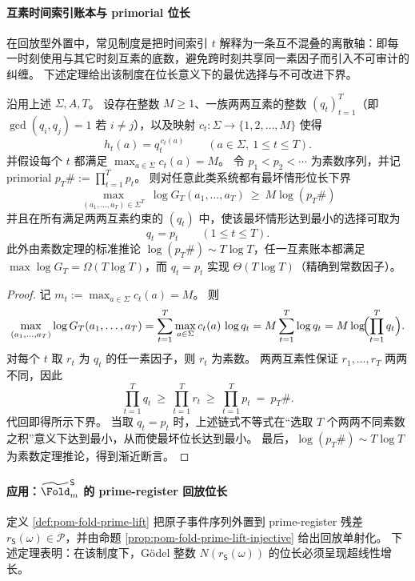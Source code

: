 

\paragraph{互素时间索引账本与 primorial 位长}
在回放型外置中，常见制度是把时间索引 \(t\) 解释为一条互不混叠的离散轴：即每一时刻使用与其它时刻互素的底数，避免跨时刻共享同一素因子而引入不可审计的纠缠。
下述定理给出该制度在位长意义下的最优选择与不可改进下界。

\begin{theorem}\label{thm:pom-coprime-ledger-primorial-optimality}
沿用上述 \(\Sigma,A,T\)。
设存在整数 \(M\ge 1\)、一族两两互素的整数 \((q_t)_{t=1}^{T}\)（即 \(\gcd(q_i,q_j)=1\) 若 \(i\ne j\)），以及映射 \(c_t:\Sigma\to\{1,2,\dots,M\}\) 使得
\[
h_t(a)=q_t^{\,c_t(a)}\qquad(a\in\Sigma,\ 1\le t\le T).
\]
并假设每个 \(t\) 都满足 \(\max_{a\in\Sigma}c_t(a)=M\)。
令 \(p_1<p_2<\cdots\) 为素数序列，并记 primorial
\(
p_T\#:=\prod_{t=1}^{T}p_t
\)。
则对任意此类系统都有最坏情形位长下界
\[
\boxed{\;
\max_{(a_1,\dots,a_T)\in\Sigma^T}\ \log G_T(a_1,\dots,a_T)
\ \ge\
M\log(p_T\#)\;}
\]
并且在所有满足两两互素约束的 \((q_t)\) 中，使该最坏情形达到最小的选择可取为
\[
q_t=p_t\qquad(1\le t\le T).
\]
此外由素数定理的标准推论 \(\log(p_T\#)\sim T\log T\)，任一互素账本都满足
\(
\max \log G_T=\Omega(T\log T)
\)，而 \(q_t=p_t\) 实现 \(\Theta(T\log T)\)（精确到常数因子）。
\end{theorem}
\begin{proof}
记 \(m_t:=\max_{a\in\Sigma}c_t(a)=M\)。
则
\[
\max_{(a_1,\dots,a_T)} \log G_T(a_1,\dots,a_T)
=\sum_{t=1}^{T}\max_{a\in\Sigma}c_t(a)\,\log q_t
=M\sum_{t=1}^{T}\log q_t
=M\log\!\Bigl(\prod_{t=1}^{T}q_t\Bigr).
\]
对每个 \(t\) 取 \(r_t\) 为 \(q_t\) 的任一素因子，则 \(r_t\) 为素数。
两两互素性保证 \(r_1,\dots,r_T\) 两两不同，因此
\[
\prod_{t=1}^{T}q_t\ \ge\ \prod_{t=1}^{T}r_t\ \ge\ \prod_{t=1}^{T}p_t\ =\ p_T\#.
\]
代回即得所示下界。
当取 \(q_t=p_t\) 时，上述链式不等式在“选取 \(T\) 个两两不同素数之积”意义下达到最小，从而使最坏位长达到最小。
最后，\(\log(p_T\#)\sim T\log T\) 为素数定理推论，得到渐近断言。
\end{proof}



\paragraph{应用：\texorpdfstring{$\widetilde{\Fold}^{\mathsf S}_m$}{Fold} 的 prime-register 回放位长}
定义 \ref{def:pom-fold-prime-lift} 把原子事件序列外置到 prime-register 残差 \(r_{\mathsf S}(\omega)\in\mathcal P\)，并由命题 \ref{prop:pom-fold-prime-lift-injective} 给出回放单射化。
下述定理表明：在该制度下，Gödel 整数 \(N(r_{\mathsf S}(\omega))\) 的位长必须呈现超线性增长。

